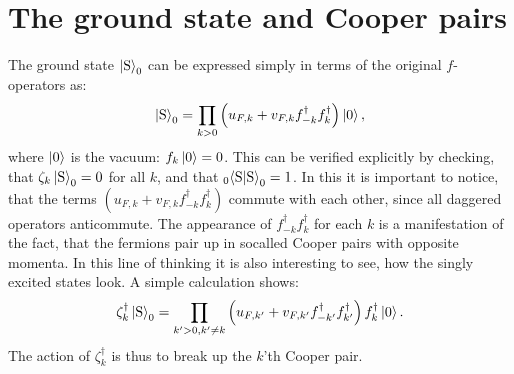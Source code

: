 \section{The ground state and Cooper pairs}
The ground state $\ket{\text{S}}_0$ can be expressed simply in terms of the original $f$-operators as:
\begin{equation}
\ket{\text{S}}_0 = \prod_{k > 0} \left(u_{F,k} + v_{F,k}f^\dagger_{-k}f^\dagger_k\right)\ket{0},
\end{equation} 
where $\ket{0}$ is the vacuum: $f_k\ket{0} = 0$. This can be verified explicitly by checking, that $\zeta_k\ket{\text{S}}_0 = 0$ for all $k$, and that $_{0}\!\braket{\text{S}|\text{S}}_0 = 1$. In this it is important to notice, that the terms $(u_{F,k} + v_{F,k}f^\dagger_{-k}f^\dagger_k)$ commute with each other, since all daggered operators anticommute. The appearance of $f^\dagger_{-k}f^\dagger_k$ for each $k$ is a manifestation of the fact, that the fermions pair up in socalled Cooper pairs with opposite momenta. In this line of thinking it is also interesting to see, how the singly excited states look. A simple calculation shows:
\begin{equation}
\zeta^\dagger_k\ket{\text{S}}_0 = \prod_{k' > 0, k' \neq k }\left(u_{F,k'} + v_{F,k'}f^\dagger_{-k'}f^\dagger_{k'}\right)f^\dagger_k\ket{0}.
\end{equation}
The action of $\zeta^\dagger_k$ is thus to break up the $k$'th Cooper pair. 

